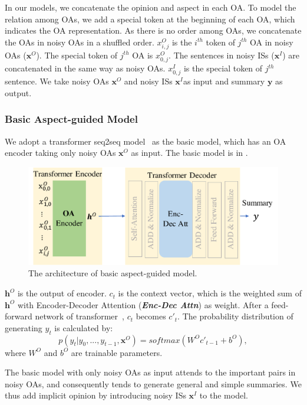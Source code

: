 In our models, 
we concatenate the opinion and aspect in each OA.
To model the relation among OAs,
we add a special token at the beginning of each OA, 
which indicates the OA representation.
As there is no order among OAs, 
we concatenate the OAs in noisy OAs in a shuffled order. 
$x^O_{i,j}$ is the $i^{th}$ token of $j^{th}$ OA in noisy OAs ($\textbf{x}^O$). The special token of $j^{th}$ OA is $x^O_{0,j}$.
The sentences in noisy ISs ($\textbf{x}^I$) are concatenated in the
same way as noisy OAs.
$x^I_{0,j}$ is the special token of $j^{th}$ sentence.
We take noisy OAs $\textbf{x}^O$ and noisy ISs $\textbf{x}^I$as input and summary $\textbf{y}$ as output.


\subsubsection{Basic Aspect-guided Model}
We adopt a transformer seq2seq model~\cite{Transformer17} as the basic model,
which has an OA encoder taking only noisy OAs $\textbf{x}^O$ as input.
The basic model is in .

\begin{figure}[th]
	\centering
	\includegraphics[width=1\linewidth]{./AMO.pdf}
	\caption{The architecture of basic aspect-guided model.}
	\label{fig:amo}
\end{figure}

$\textbf{h}^O$ is the output of encoder.
$c_t$ is the context vector, which is the weighted sum of $\textbf{h}^O$ with Encoder-Decoder Attention (\textbf{{\em Enc-Dec Attn}}) as weight.
After a feed-forward network of transformer~\cite{Transformer17},
$c_t$ becomes $c'_t$.
The probability distribution of 
generating $y_t$ is calculated by:
\begin{equation}
p(y_t|y_0,...,y_{t-1}, \textbf{x}^O)=softmax(W^O c'_{t-1}+b^O),
\label{eq:decode}
\end{equation}
where $W^O$ and $b^O$ are trainable parameters.

The basic model with only noisy OAs as input attends to the important pairs in noisy OAs, 
and consequently tends to generate general and simple summaries.
We thus add implicit opinion by introducing noisy ISs $\textbf{x}^I$ to the model.
	
